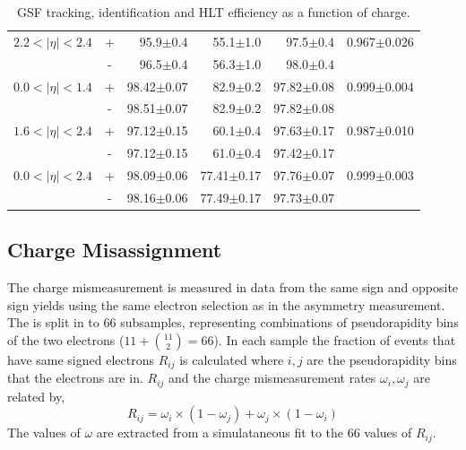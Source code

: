 \begin{table}[htbp]
\begin{center}
\begin{tabular}{lcrrrr}
$2.2<| \eta |<2.4$ &+& 95.9$\pm$0.4 &55.1$\pm$1.0 &97.5$\pm$0.4 & 0.967$\pm$0.026\\
                   &-& 96.5$\pm$0.4 &56.3$\pm$1.0 &98.0$\pm$0.4 & \\
\midrule
$0.0<| \eta |<1.4$ &+& 98.42$\pm$0.07 &82.9$\pm$0.2 &97.82$\pm$0.08 & 0.999$\pm$0.004\\
                   &-& 98.51$\pm$0.07 &82.9$\pm$0.2 &97.82$\pm$0.08 & \\
$1.6<| \eta |<2.4$ &+& 97.12$\pm$0.15 &60.1$\pm$0.4 &97.63$\pm$0.17 & 0.987$\pm$0.010\\
                   &-& 97.12$\pm$0.15 &61.0$\pm$0.4 &97.42$\pm$0.17 & \\
\midrule
$0.0<| \eta |<2.4$ &+& 98.09$\pm$0.06 &77.41$\pm$0.17 &97.76$\pm$0.07 & 0.999$\pm$0.003\\
                   &-& 98.16$\pm$0.06 &77.49$\pm$0.17 &97.73$\pm$0.07 & \\
\bottomrule
\end{tabular}
\end{center}
\caption{\label{tab:updatedefficiency} GSF tracking, identification and HLT efficiency as a function of charge.}
\end{table}

\subsection{Charge Misassignment}
The charge mismeasurement is measured in data from the same sign and opposite
sign \PZ yields using the same electron selection as in the asymmetry
measurement.
The \HepProcess{\PZ\to\Pe\Pe} is split in to 66 subsamples, representing
combinations of pseudorapidity bins of the two electrons ($11+\binom{11}{2} =
66$).
In each sample the fraction of events that have same signed electrons $R_{ij}$
is calculated where $i,j$ are the pseudorapidity bins that the electrons are in.
$R_{ij}$ and the charge mismeasurement rates $\omega_{i},\omega_{j}$ are related
by,
\begin{equation}
R_{ij}=\omega_i \times(1-\omega_j) + \omega_j \times(1-\omega_i)
\end{equation}
The values of $\omega$ are extracted from a simulataneous fit to the 66 values
of $R_{ij}$.

